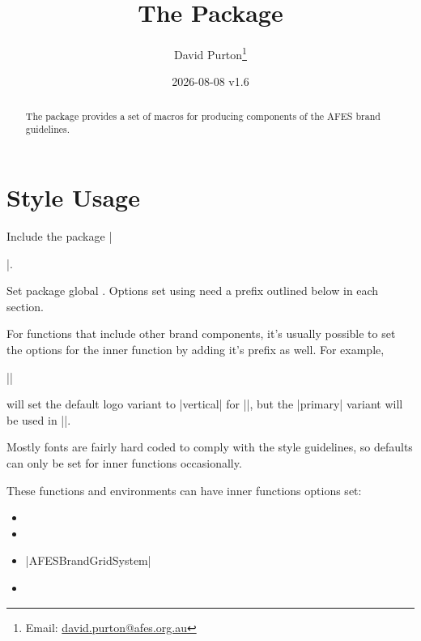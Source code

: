 \documentclass[a4paper]{l3doc}
\begin{document}
\title{The  Package}
\author{David Purton\thanks{Email: \url{david.purton@afes.org.au}}}
\date{2026-08-08 v1.6}

\maketitle

\begin{abstract}
  The  package provides a set of macros for producing
  components of the AFES brand guidelines.
\end{abstract}

\begingroup
\renewcommand\baselinestretch{0.9}\selectfont
\tableofcontents
\endgroup

\clearpage

\section{Style Usage}

Include the package |\usepackage{afesbrand}|.

\begin{function}{\AFESBrandSetOptions}
  \begin{syntax}
  \end{syntax}
  Set package global . Options set using
   need a prefix outlined below in each section.
\end{function}

For functions that include other brand components, it's usually possible to
set the options for the inner function by adding it's prefix as well. For
example,

{\centering
 ||\par
}

will set the default logo variant to |vertical| for |\AFESBrandLogo|, but the
|primary| variant will be used in |\AFESBrandEmailSignature|.

Mostly fonts are fairly hard coded to comply with the style guidelines, so
defaults can only be set for inner functions occasionally.

These functions and environments can have inner functions options set:

\begin{itemize}
  \item {}
  \item {}
  \item |AFESBrandGridSystem|
  \item {}
\end{itemize}
\end{document}
